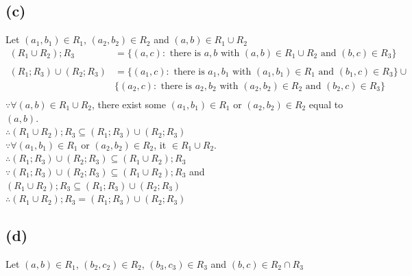 \documentclass{article} %
\begin{document}
\subsection*{(c)}
Let $(a_{1},b_{1})\in R_{1}$, $(a_{2},b_{2})\in R_{2}$ and $(a,b)\in R_{1}\cup R_{2}$\\
\[\begin{array}{rlcr}
(R_{1}\cup R_{2});R_{3}	&=\{(a,c):\mbox{ there is }a,b\mbox{ with }(a,b)\in R_{1}\cup R_{2}\mbox{ and }(b,c)\in R_{3}\}\\
						
\\
(R_{1};R_{3})\cup (R_{2};R_{3})&=\{(a_{1},c):\mbox{ there is }a_{1},b_{1}\mbox{ with }(a_{1},b_{1})\in R_{1}\mbox{ and }(b_{1},c)\in R_{3}\}\cup\\
						&\{(a_{2},c):\mbox{ there is }a_{2},b_{2}\mbox{ with }(a_{2},b_{2})\in R_{2}\mbox{ and }(b_{2},c)\in R_{3}\}\\

\end{array}\]
$\because\forall(a,b)\in  R_{1}\cup R_{2}$, there exist some $(a_{1},b_{1})\in R_{1}$ or $(a_{2},b_{2})\in R_{2}$ equal to $(a,b)$.\\
$\therefore (R_{1}\cup R_{2});R_{3}\subseteq (R_{1};R_{3})\cup (R_{2};R_{3})$\\
$\because\forall(a_{1},b_{1})\in R_{1}$ or $(a_{2},b_{2})\in R_{2}$, it $\in R_{1}\cup R_{2}$.\\
$\therefore (R_{1};R_{3})\cup (R_{2};R_{3}) \subseteq (R_{1}\cup R_{2});R_{3}$\\
$\because (R_{1};R_{3})\cup (R_{2};R_{3}) \subseteq (R_{1}\cup R_{2});R_{3}$ and $(R_{1}\cup R_{2});R_{3}\subseteq (R_{1};R_{3})\cup (R_{2};R_{3})$\\
$\therefore (R_{1}\cup R_{2});R_{3}=(R_{1};R_{3})\cup (R_{2};R_{3})$\\


\subsection*{(d)}
Let $(a,b)\in R_{1}$, $(b_{2},c_{2})\in R_{2}$, $(b_{3},c_{3})\in R_{3}$ and $(b,c)\in R_{2}\cap R_{3}$\\
\end{document}
